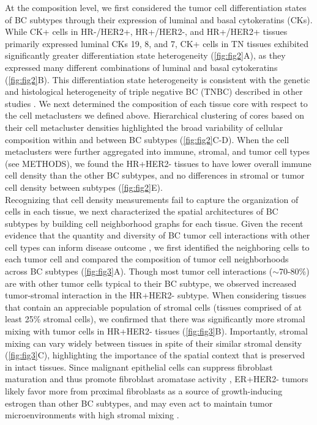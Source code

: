 \documentclass[preprint,review,3p,12pt]{elsarticle}
\begin{document}
At the composition level, we first considered the tumor cell differentiation states of BC subtypes through their expression of luminal and basal cytokeratins (CKs). While CK+ cells in HR-/HER2+, HR+/HER2-, and HR+/HER2+ tissues primarily expressed luminal CKs 19, 8, and 7, CK+ cells in TN tissues exhibited significantly greater differentiation state heterogeneity (\autoref{fig:fig2}A), as they expressed many different combinations of luminal and basal cytokeratins (\autoref{fig:fig2}B). This differentiation state heterogeneity is consistent with the genetic and histological heterogeneity of triple negative BC (TNBC) described in other studies \cite{haupt2010, tnbc2016}. We next determined the composition of each tissue core with respect to the cell metaclusters we defined above. Hierarchical clustering of cores based on their cell metacluster densities highlighted the broad variability of cellular composition within and between BC subtypes (\autoref{fig:fig2}C-D). When the cell metaclusters were further aggregated into immune, stromal, and tumor cell types (see METHODS), we found the HR+HER2- tissues to have lower overall immune cell density than the other BC subtypes, and no differences in stromal or tumor cell density between subtypes (\autoref{fig:fig2}E). \\

Recognizing that cell density measurements fail to capture the organization of cells in each tissue, we next characterized the spatial architectures of BC subtypes by building cell neighborhood graphs for each tissue. Given the recent evidence that the quantity and diversity of BC tumor cell interactions with other cell types can inform disease outcome \cite{jackson_single-cell_2020,keren2018}, we first identified the neighboring cells to each tumor cell and compared the composition of tumor cell neighborhoods across BC subtypes (\autoref{fig:fig3}A). Though most tumor cell interactions ($\sim$70-80\%) are with other tumor cells typical to their BC subtype, we observed increased tumor-stromal interaction in the HR+HER2- subtype. When considering tissues that contain an appreciable population of stromal cells (tissues comprised of at least 25\% stromal cells), we confirmed that there was significantly more stromal mixing with tumor cells in HR+HER2- tissues (\autoref{fig:fig3}B). Importantly, stromal mixing can vary widely between tissues in spite of their similar stromal density (\autoref{fig:fig3}C), highlighting the importance of the spatial context that is preserved in intact tissues. Since malignant epithelial cells can suppress fibroblast maturation and thus promote fibroblast aromatase activity \cite{bulun2012}, ER+HER2- tumors likely favor more from proximal fibroblasts as a source of growth-inducing estrogen than other BC subtypes, and may even act to maintain tumor microenvironments with high stromal mixing \cite{brechbuhl2017}. \\
\end{document}

